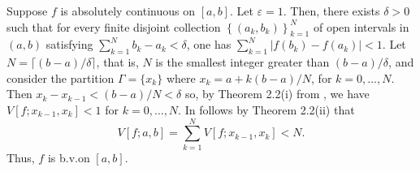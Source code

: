 \begin{solution}
  Suppose $f$ is absolutely continuous on $[a,b]$. Let $\varepsilon=
  1$. Then, there exists $\delta>0$ such that for every finite disjoint
  collection $\left\{(a_k,b_k)\right\}_{k=1}^N$ of open intervals in
  $(a,b)$ satisfying $\sum_{k=1}^Nb_k-a_k<\delta$, one has
  $\sum_{k=1}^N\left|f(b_k)-f(a_k)\right|<1$. Let
  $N=\lceil(b-a)/\delta\rceil$, that is, $N$ is the smallest integer
  greater than $(b-a)/\delta$, and consider the partition $\Gamma=\{x_k\}$
  where $x_k= a+k(b-a)/N$, for $k=0,\dotsc,N$. Then
  $x_k-x_{k-1}<(b-a)/N<\delta$ so, by Theorem 2.2(i) from \cite[Ch.\@ 2,
  p.\@ 19]{wheeden-zygmund}, we have $V[f;x_{k-1},x_k]<1$ for
  $k=0,\dotsc,N$. In follows by Theorem 2.2(ii) that
  \begin{equation}
    \label{eq:prep:1:14}
    V[f;a,b]=\sum_{k=1}^N V[f;x_{k-1},x_k]<N.
  \end{equation}
  Thus, $f$ is b.v.\@ on $[a,b]$.
\end{solution}

